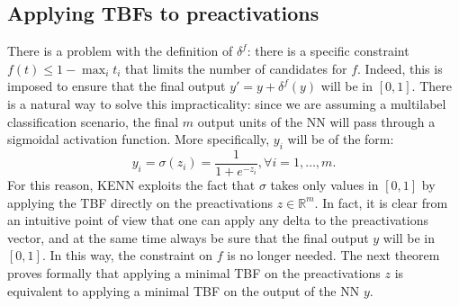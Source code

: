 \subsection{Applying TBFs to preactivations} 
\label{sec:tbf_preac}
There is a problem with the definition of $\delta^f$: there is a specific constraint $f(t) \leq 1 - \max_i t_i$ that limits the number of candidates for $f$. Indeed, this is imposed to ensure that the final output $y'= y + \delta^f(y)$ will be in $\left[0,1\right]$. There is a natural way to solve this impracticality: since we are assuming a multilabel classification scenario, the final $m$ output units of the NN will pass through a sigmoidal activation function. More specifically, $y_i$ will be of the form:
\begin{equation*}
y_i = \sigma(z_i) = \frac{1}{1+e^{-z_i}}, \forall i=1,\dots,m.	
\end{equation*}
For this reason, KENN exploits the fact that $\sigma$ takes only values in $\left[0,1\right]$ by applying the TBF directly on the preactivations $z\in \mathbb{R}^m$. In fact, it is clear from an intuitive point of view that one can apply any delta to the preactivations vector, and at the same time always be sure that the final output $y$ will be in $\left[0,1\right]$. In this way, the constraint on $f$ is no longer needed. The next theorem proves formally that applying a minimal TBF on the preactivations $z$ is equivalent to applying a minimal TBF on the output of the NN $y$.

